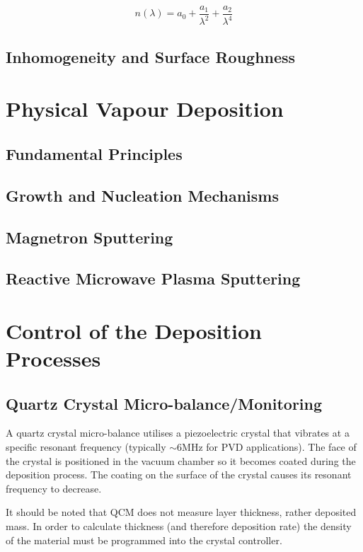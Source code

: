 \documentclass[10pt,a4paper,portrait]{report}
\begin{document}
\begin{equation}
n(\lambda) = a_0 + \frac{a_1}{\lambda^2} + \frac{a_2}{\lambda^4} 
\end{equation}
\subsection{Inhomogeneity and Surface Roughness}

\section{Physical Vapour Deposition}
\subsection{Fundamental Principles}
\subsection{Growth and Nucleation Mechanisms}

\subsection{Magnetron Sputtering}\label{section-magnetron-sputtering}

\subsection{Reactive Microwave Plasma Sputtering}


\section{Control of the Deposition Processes}

\subsection{Quartz Crystal Micro-balance/Monitoring}

A quartz crystal micro-balance utilises a piezoelectric crystal that vibrates at a specific resonant frequency (typically $\sim6$MHz for PVD applications). The face of the crystal is positioned in the vacuum chamber so it becomes coated during the deposition process. The coating on the surface of the crystal causes its resonant frequency to decrease. 

It should be noted that QCM does not measure layer thickness, rather deposited mass. In order to calculate thickness (and therefore deposition rate) the density of the material must be programmed into the crystal controller.
\end{document}
